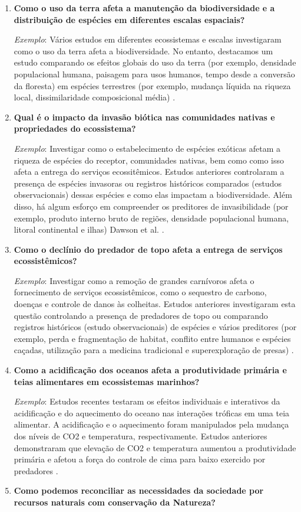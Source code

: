 \documentclass[
]{book}
\begin{document}
\begin{enumerate}
\def\labelenumi{(\alph{enumi})}
\item
  \textbf{Como o uso da terra afeta a manutenção da biodiversidade e a distribuição de espécies em diferentes escalas espaciais?}

  \emph{Exemplo}: Vários estudos em diferentes ecossistemas e escalas investigaram como o uso da terra afeta a biodiversidade. No entanto, destacamos um estudo comparando os efeitos globais do uso da terra (por exemplo, densidade populacional humana, paisagem para usos humanos, tempo desde a conversão da floresta) em espécies terrestres (por exemplo, mudança líquida na riqueza local, dissimilaridade composicional média) \citep{newbold_global_2015}.
\item
  \textbf{Qual é o impacto da invasão biótica nas comunidades nativas e propriedades do ecossistema?}

  \emph{Exemplo}: Investigar como o estabelecimento de espécies exóticas afetam a riqueza de espécies do receptor, comunidades nativas, bem como como isso afeta a entrega do serviços ecossitêmicos. Estudos anteriores controlaram a presença de espécies invasoras ou registros históricos comparados (estudos observacionais) dessas espécies e como elas impactam a biodiversidade. Além disso, há algum esforço em compreender os preditores de invasibilidade (por exemplo, produto interno bruto de regiões, densidade populacional humana, litoral continental e ilhas) Dawson et al. \citeyearpar{dawson_global_2017}.
\item
  \textbf{Como o declínio do predador de topo afeta a entrega de serviços ecossistêmicos?}

  \emph{Exemplo}: Investigar como a remoção de grandes carnívoros afeta o fornecimento de serviços ecossistêmicos, como o sequestro de carbono, doenças e controle de danos às colheitas. Estudos anteriores investigaram esta questão controlando a presença de predadores de topo ou comparando registros históricos (estudo observacionais) de espécies e vários preditores (por exemplo, perda e fragmentação de habitat, conflito entre humanos e espécies caçadas, utilização para a medicina tradicional e superexploração de presas) \citep{ripple_status_2014}.
\item
  \textbf{Como a acidificação dos oceanos afeta a produtividade primária e teias alimentares em ecossistemas marinhos?}

  \emph{Exemplo}: Estudos recentes testaram os efeitos individuais e interativos da acidificação e do aquecimento do oceano nas interações tróficas em uma teia alimentar. A acidificação e o aquecimento foram manipulados pela mudança dos níveis de CO2 e temperatura, respectivamente. Estudos anteriores demonstraram que elevação de CO2 e temperatura aumentou a produtividade primária e afetou a força do controle de cima para baixo exercido por predadores \citep{goldenberg_boosted_2017}.
\item
  \textbf{Como podemos reconciliar as necessidades da sociedade por recursos naturais com conservação da Natureza?}


\end{enumerate}
\end{document}
